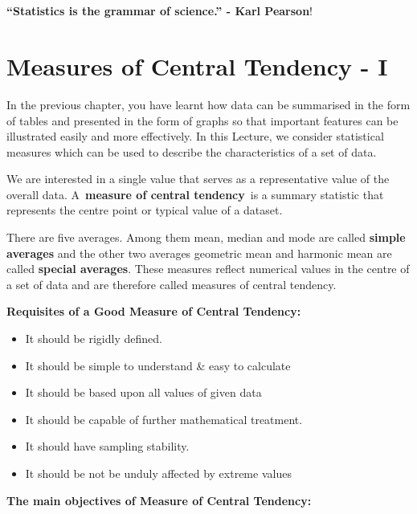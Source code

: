 \documentclass[
]{book}
\begin{document}
~\\
\hspace*{0.333em}\\
\hspace*{0.333em}

\hypertarget{hello}{}
\textbf{``Statistics is the grammar of science.'' - Karl Pearson}!

\hypertarget{measures-of-central-tendency---i}{%
\chapter{Measures of Central Tendency - I}\label{measures-of-central-tendency---i}}

In the previous chapter, you have learnt how data can be summarised in
the form of tables and presented in the form of graphs so that important
features can be illustrated easily and more effectively. In this
Lecture, we consider statistical measures which can be used to describe
the characteristics of a set of data.

We are interested in a single value that serves as a representative
value of the overall data. A~\textbf{measure of central tendency}~is a
summary statistic that represents the centre point or typical value of a
dataset.

There are five averages. Among them mean, median and mode are called
\textbf{simple averages} and the other two averages geometric mean and
harmonic mean are called \textbf{special averages}. These measures reflect
numerical values in the centre of a set of data and are therefore called
measures of central tendency.

{\textbf{Requisites of a Good Measure of Central Tendency:}}

\begin{itemize}
\item
  It should be rigidly defined.
\item
  It should be simple to understand \& easy to calculate
\item
  It should be based upon all values of given data
\item
  It should be capable of further mathematical treatment.
\item
  It should have sampling stability.
\item
  It should be not be unduly affected by extreme values
\end{itemize}

\textbf{The main objectives of Measure of Central Tendency:}
\end{document}
